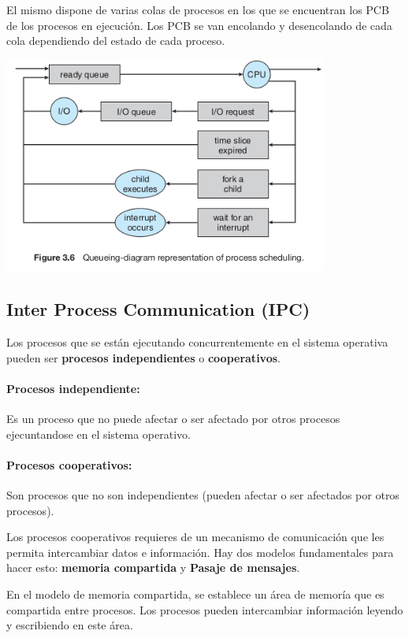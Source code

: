 El mismo dispone de varias colas de procesos en los que se encuentran los PCB de los procesos en ejecución. Los PCB se van encolando y desencolando de cada cola dependiendo del estado de cada proceso.

\vspace*{0.5cm}
\begin{center}
	\includegraphics[width=0.8\textwidth]{imagenes/process_queues.png}
\end{center}

\subsection{Inter Process Communication (IPC)}
Los procesos que se están ejecutando concurrentemente en el sistema operativa pueden ser \textbf{procesos independientes} o \textbf{cooperativos}.

\paragraph{Procesos independiente:} Es un proceso que no puede afectar o ser afectado por otros procesos ejecuntandose en el sistema operativo.

\paragraph{Procesos cooperativos:} Son procesos que no son independientes (pueden afectar o ser afectados por otros procesos).

Los procesos cooperativos requieres de un mecanismo de comunicación que les permita intercambiar datos e información. Hay dos modelos fundamentales para hacer esto: \textbf{memoria compartida} y \textbf{Pasaje de mensajes}.

En el modelo de memoria compartida, se establece un área de memoría que es compartida entre procesos. Los procesos pueden intercambiar información leyendo y escribiendo en este área.

